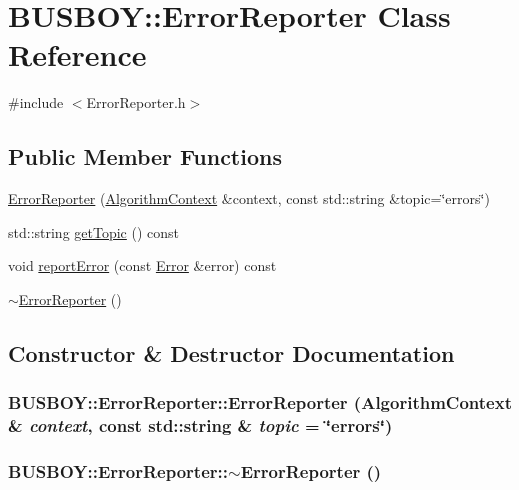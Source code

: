 \hypertarget{classBUSBOY_1_1ErrorReporter}{
\section{BUSBOY::ErrorReporter Class Reference}
\label{classBUSBOY_1_1ErrorReporter}
}


{\ttfamily \#include $<$ErrorReporter.h$>$}\subsection*{Public Member Functions}
\begin{DoxyCompactItemize}
\item 
\hyperlink{classBUSBOY_1_1ErrorReporter_a126faf2a8cf4f17e16fb7c8020c9c4b7}{ErrorReporter} (\hyperlink{classBUSBOY_1_1AlgorithmContext}{AlgorithmContext} \&context, const std::string \&topic=\char`\"{}errors\char`\"{})
\item 
std::string \hyperlink{classBUSBOY_1_1ErrorReporter_a98d8d47db959aa6bc5d3dccd42ef104c}{getTopic} () const 
\item 
void \hyperlink{classBUSBOY_1_1ErrorReporter_a4a7d834a994488065a1d96cba82a8c40}{reportError} (const \hyperlink{classBUSBOY_1_1Error}{Error} \&error) const 
\item 
\hyperlink{classBUSBOY_1_1ErrorReporter_ada63ef6b20a970f5ea293db7b44d98fd}{$\sim$ErrorReporter} ()
\end{DoxyCompactItemize}


\subsection{Constructor \& Destructor Documentation}
\hypertarget{classBUSBOY_1_1ErrorReporter_a126faf2a8cf4f17e16fb7c8020c9c4b7}{
\subsubsection[{ErrorReporter}]{\setlength{\rightskip}{0pt plus 5cm}BUSBOY::ErrorReporter::ErrorReporter ({\bf AlgorithmContext} \& {\em context}, \/  const std::string \& {\em topic} = {\ttfamily \char`\"{}errors\char`\"{}})}}
\label{classBUSBOY_1_1ErrorReporter_a126faf2a8cf4f17e16fb7c8020c9c4b7}
\hypertarget{classBUSBOY_1_1ErrorReporter_ada63ef6b20a970f5ea293db7b44d98fd}{
\subsubsection[{$\sim$ErrorReporter}]{\setlength{\rightskip}{0pt plus 5cm}BUSBOY::ErrorReporter::$\sim$ErrorReporter ()}}
\label{classBUSBOY_1_1ErrorReporter_ada63ef6b20a970f5ea293db7b44d98fd}


